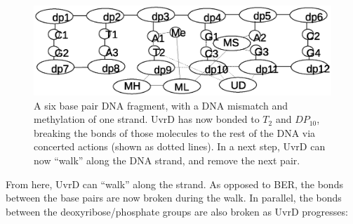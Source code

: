 \documentclass[review]{elsarticle}
\begin{document}
\begin{figure}[h!]
  \centering
    \includegraphics[width=1.0\textwidth]{mmr/state3}
  \caption[A six base pair DNA fragment.]{A six base pair DNA fragment, with a DNA mismatch and methylation of one strand. UvrD has now bonded to $T_2$ and $DP_{10}$, breaking the bonds of those molecules to the rest of the DNA via concerted actions (shown as dotted lines). In a next step, UvrD can now ``walk'' along the DNA strand, and remove the next pair.}
  \label{fig:state3}
\end{figure}

From here, UvrD can ``walk'' along the strand. As opposed to BER, the bonds between the base pairs are now broken during the walk. In parallel, the bonds between the deoxyribose/phosphate groups are also broken as UvrD progresses:
%
%
%
\end{document}
